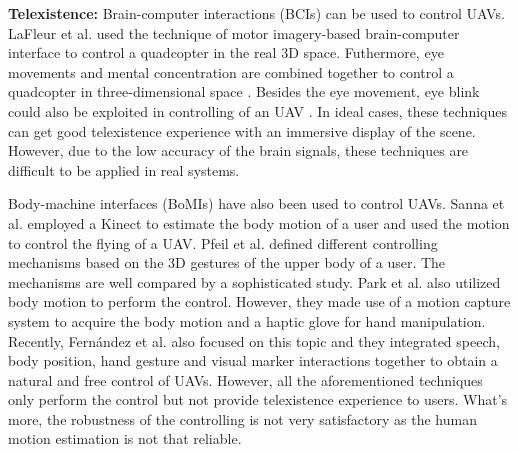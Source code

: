 \documentclass[journal]{IEEEtran}
\begin{document}
\textbf{Telexistence:}
Brain-computer interactions (BCIs) can be used to control UAVs. 
LaFleur et al. \cite{1741-2552-10-4-046003} used the technique of motor 
imagery-based brain-computer interface to control a 
quadcopter in the real 3D space. 
Futhermore, eye movements and mental concentration are combined together to 
control a quadcopter in three-dimensional space \cite{KIM201482}. 
Besides the eye movement, eye blink could also be exploited in controlling 
of an UAV \cite{7846875}. In ideal cases, these techniques can get good 
telexistence experience with an immersive display of the scene. 
However, due to the low accuracy of the brain signals, these 
techniques are difficult to be applied in real systems.

Body-machine interfaces (BoMIs) have also been used to control UAVs. 
Sanna et al. \cite{SANNA2013179} employed a Kinect to estimate the 
body motion of a user 
and used the motion to control the flying of a UAV. 
Pfeil et al. \cite{Pfeil:2013:EGM:2449396.2449429} defined 
different controlling mechanisms based on the 3D gestures of the upper body of 
a user. The mechanisms are well compared by a sophisticated study. 
Park et al. \cite{7625774} also 
utilized body motion to perform the control. However, they made use of a motion capture 
system to acquire the body motion and a haptic glove for hand manipulation. Recently, 
Fernández et al. \cite{7502665} also focused on this topic and they integrated speech, body position, 
hand gesture and visual marker interactions together to obtain a natural and free control 
of UAVs. However, all the aforementioned techniques only perform the control but not 
provide telexistence experience to users. What’s more, the robustness of the controlling 
is not very satisfactory as the human motion estimation is not that reliable.
\end{document}

